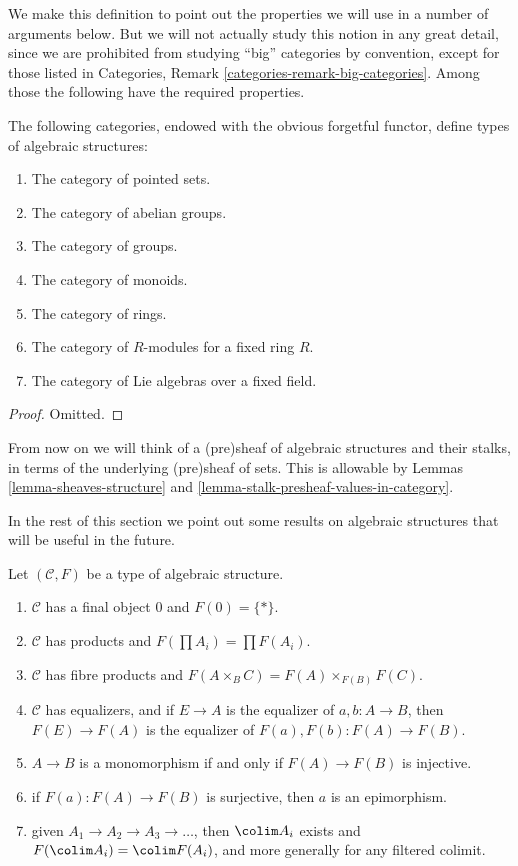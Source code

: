 \noindent
We make this definition to point out the properties
we will use in a number of arguments below.  But we will
not actually study this notion in any great detail, since we
are prohibited from studying ``big'' categories by convention,
except for those listed in
Categories, Remark \ref{categories-remark-big-categories}.
Among those the following have the required properties.

\begin{lemma}
\label{lemma-list-algebraic-structures}
The following categories, endowed with the obvious forgetful
functor, define types of algebraic structures:
\begin{enumerate}
\item The category of pointed sets.
\item The category of abelian groups.
\item The category of groups.
\item The category of monoids.
\item The category of rings.
\item The category of $R$-modules for a fixed ring $R$.
\item The category of Lie algebras over a fixed field.
\end{enumerate}
\end{lemma}

\begin{proof}
Omitted.
\end{proof}

\noindent
From now on we will think of a (pre)sheaf of algebraic structures
and their stalks, in terms of the underlying (pre)sheaf of sets.
This is allowable by Lemmas \ref{lemma-sheaves-structure} and
\ref{lemma-stalk-presheaf-values-in-category}.

\medskip\noindent
In the rest of this section we point out some results
on algebraic structures that will be useful in the future.

\begin{lemma}
\label{lemma-properties-algebraic-structures}
Let $(\mathcal{C}, F)$ be a type of algebraic structure.
\begin{enumerate}
\item $\mathcal{C}$ has a final object $0$ and $F(0) = \{ * \}$.
\item $\mathcal{C}$ has products and $F(\prod A_i) = \prod F(A_i)$.
\item $\mathcal{C}$ has fibre products and
$F(A \times_B C) = F(A)\times_{F(B)}F(C)$.
\item $\mathcal{C}$ has equalizers, and if $E \to A$
is the equalizer of $a, b : A \to B$, then
$F(E) \to F(A)$ is the equalizer of $F(a), F(b) : F(A) \to F(B)$.
\item $A \to B$ is a monomorphism if and only if
$F(A) \to F(B)$ is injective.
\item if $F(a) : F(A) \to F(B)$ is surjective, then
$a$ is an epimorphism.
\item given $A_1 \to A_2 \to A_3 \to \ldots$, then
$\colim A_i$ exists and $F(\colim A_i) = \colim F(A_i)$,
and more generally for any filtered colimit.
\end{enumerate}
\end{lemma}

